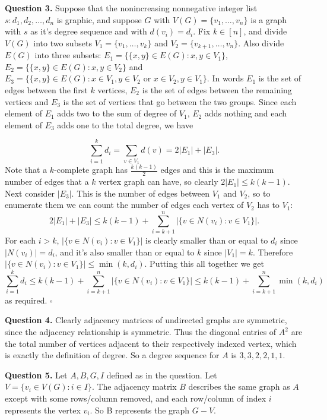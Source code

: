 \documentclass[letterpaper, reqno,11pt]{article}
\begin{document}
{\medskip\noindent\bf Question 3.} Suppose that the nonincreasing nonnegative integer list $s: d_1, d_2, \ldots,d_n$ is graphic, and suppose $G$ with $V(G)=\{v_1,\ldots,v_n\} $ is a graph with $s$ as it's degree sequence and with $d(v_i)=d_i$. Fix $k\in [n]$, and divide $V(G)$ into two subsets $V_1=\{v_1,\ldots,v_k\}$ and $V_2=\{v_{k+1},\ldots,v_n\}$. Also divide $E(G)$ into three subsets: $E_1=\{\{x,y\} \in E(G): x,y\in V_1\}$, $E_2=\{\{x,y\} \in E(G): x,y\in V_2\}$ and $E_3=\{\{x,y\} \in E(G): x\in V_1,y\in V_2\text{ or }x\in V_2,y\in V_1\}$. In words $E_1$ is the set of edges between the first $k$ vertices, $E_2$ is the set of edges between the remaining vertices  and $E_3$ is the set of vertices that go between the two groups. Since each element of $E_1$ adds two to the sum of degree of $V_1$, $E_2$ adds nothing and each element of $E_3$ adds one to the total degree, we have

\[
    \sum_{i=1}^{k}d_i=\sum_{v\in V_1}d(v)=2|E_1|+|E_3|
.\]
Note that a $k$-complete graph has $\frac{k(k-1)}{2}$ edges and this is the maximum number of edges that a $k$ vertex graph can have, so clearly $2|E_1|\leq k(k-1)$. Next consider $|E_3|$. This is the number of edges between $V_1$ and $V_2$, so to enumerate them we can count the number of edges each vertex of $V_2$ has to $V_1$: 
\[
    2|E_1|+|E_3|\leq k(k-1)+\sum_{i=k+1}^{n}\left| \{v\in N(v_i):v\in V_1\}  \right| 
.\]
For each $i>k$, $\left| \{v\in N(v_i):v\in V_1\}  \right|$ is clearly smaller than or equal to $d_i$ since $|N(v_i)|=d_i$, and it's also smaller than or equal to $k$ since $|V_1|=k$. Therefore $\left| \{v\in N(v_i):v\in V_1\}  \right|\leq \min(k,d_i)$. Putting this all together we get 
\[
    \sum_{i=1}^{k}d_i\leq k(k-1)+\sum_{i=k+1}^{n}\left| \{v\in N(v_i):v\in V_1\}  \right|\leq k(k-1)+\sum_{i=k+1}^{n}\min(k,d_i)
\]
as required. $\square$ 

{\medskip\noindent\bf Question 4.} Clearly adjacency matrices of undirected graphs are symmetric, since the adjacency relationship is symmetric. Thus the diagonal entries of $A^2$ are the total number of vertices adjacent to their respectively indexed vertex, which is exactly the definition of degree. So a degree sequence for $A$ is $3,3,2,2,1,1$.

{\medskip\noindent\bf Question 5.} Let $A,B,G,I$ defined as in the question. Let $V=\{v_i\in V(G): i\in I\}$. The adjacency matrix $B$ describes the same graph as $A$ except with some rows/column removed, and each row/column of index $i$ represents the vertex $v_i$. So B represents the graph $G-V$. 
\end{document}
